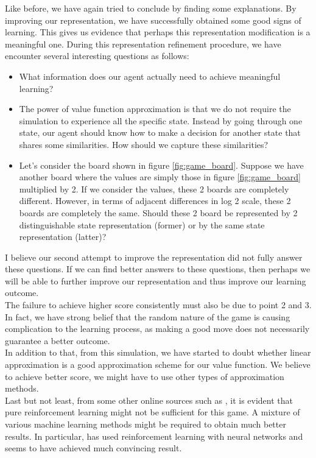 Like before, we have again tried to conclude by finding some explanations. By improving our representation, we have successfully obtained some good signs of learning. This gives us evidence that perhaps this representation modification is a meaningful one. During this representation refinement procedure, we have encounter several interesting questions as follows:
\begin{itemize}
	\item What information does our agent actually need to achieve meaningful learning?
	\item The power of value function approximation is that we do not require the simulation to experience all the specific state. Instead by going through one state, our agent should know how to make a decision for another state that shares some similarities. How should we capture these similarities?
	\item Let's consider the board shown in figure \ref{fig:game_board}. Suppose we have another board where the values are simply those in figure \ref{fig:game_board} multiplied by 2. If we consider the values, these 2 boards are completely different. However, in terms of adjacent differences in log 2 scale, these 2 boards are completely the same. Should these 2 board be represented by 2 distinguishable state representation (former) or by the same state representation (latter)?
\end{itemize}
I believe our second attempt to improve the representation did not fully answer these questions. If we can find better answers to these questions, then perhaps we will be able to further improve our representation and thus improve our learning outcome.
\\ 

The failure to achieve higher score consistently must also be due to point 2 and 3. In fact, we have strong belief that the random nature of the game is causing complication to the learning process, as making a good move does not necessarily guarantee a better outcome.
\\

In addition to that, from this simulation, we have started to doubt whether linear approximation is a good approximation scheme for our value function. We believe to achieve better score, we might have to use other types of approximation methods.
\\

Last but not least, from some other online sources such as \cite{dedieu2017deep}, it is evident that pure reinforcement learning might not be sufficient for this game. A mixture of various machine learning methods might be required to obtain much better results. In particular, \cite{dedieu2017deep} has used reinforcement learning with neural networks and seems to have achieved much convincing result.
\\

